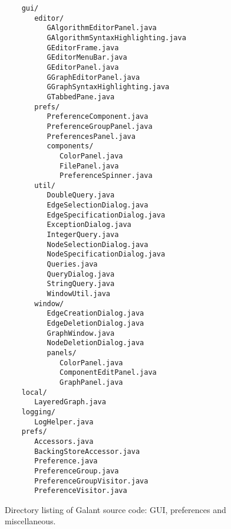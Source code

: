 \begin{figure}

  \begin{center}
      \begin{minipage}{4in}
  \small
\begin{verbatim}
    gui/
       editor/
          GAlgorithmEditorPanel.java
          GAlgorithmSyntaxHighlighting.java
          GEditorFrame.java
          GEditorMenuBar.java
          GEditorPanel.java
          GGraphEditorPanel.java
          GGraphSyntaxHighlighting.java
          GTabbedPane.java
       prefs/
          PreferenceComponent.java
          PreferenceGroupPanel.java
          PreferencesPanel.java
          components/
             ColorPanel.java
             FilePanel.java
             PreferenceSpinner.java
       util/
          DoubleQuery.java
          EdgeSelectionDialog.java
          EdgeSpecificationDialog.java
          ExceptionDialog.java
          IntegerQuery.java
          NodeSelectionDialog.java
          NodeSpecificationDialog.java
          Queries.java
          QueryDialog.java
          StringQuery.java
          WindowUtil.java
       window/
          EdgeCreationDialog.java
          EdgeDeletionDialog.java
          GraphWindow.java
          NodeDeletionDialog.java
          panels/
             ColorPanel.java
             ComponentEditPanel.java
             GraphPanel.java
    local/
       LayeredGraph.java
    logging/
       LogHelper.java
    prefs/
       Accessors.java
       BackingStoreAccessor.java
       Preference.java
       PreferenceGroup.java
       PreferenceGroupVisitor.java
       PreferenceVisitor.java
\end{verbatim}
      \end{minipage}
  \end{center}

  \medskip
  \caption{Directory listing of Galant source code: GUI, preferences and miscellaneous.}
  \label{fig:directory_listing_gui}
\end{figure}

